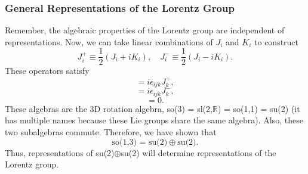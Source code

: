 \documentclass[11pt]{article}
\theoremstyle{definition}
\begin{document}
\subsubsection{General Representations of the Lorentz Group}
Remember, the algebraic properties of the Lorentz group are independent of representations. Now, we can take linear combinations of $J_i$ and $K_i$ to construct
\begin{equation}
    J_i^+ \equiv \frac{1}{2}(J_i + iK_i), \quad J_i^- \equiv \frac{1}{2}(J_i - iK_i).
\end{equation}
These operators satisfy
\begin{equation}
    [J_i^+,J_j^+ ] = i\epsilon_{ijk}J_k^+,
\end{equation}
\begin{equation}
    [J_i^-,J_j^-] = i\epsilon_{ijk}J_k^-,
\end{equation}
\begin{equation}
    [J_i^+,J_j^-] = 0.
\end{equation}
These algebras are the 3D rotation algebra, so(3) = sl(2,$\mathbb{R}$) = so(1,1) = su(2) (it has multiple names because these Lie groups share the same algebra). Also, these two subalgebras commute. Therefore, we have shown that
\begin{equation}
    \text{so(1,3) = su(2)}\oplus\text{su(2)}.
\end{equation}
Thus, representations of su(2)$\oplus$su(2) will determine representations of the Lorentz group. 
\end{document}
